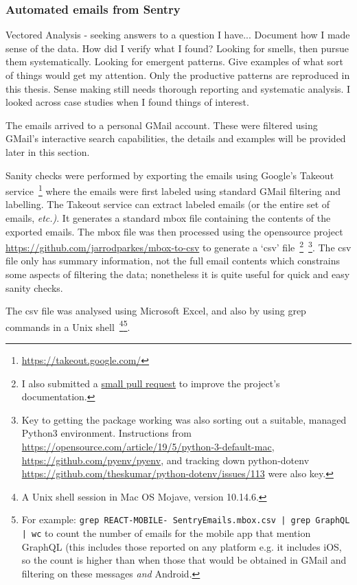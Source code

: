 \subsubsection{Automated emails from Sentry}
Vectored Analysis - seeking answers to a question I have...
Document how I made sense of the data. How did I verify what I found?
Looking for smells, then pursue them systematically. Looking for emergent patterns. Give examples of what sort of things would get my attention. Only the productive patterns are reproduced in this thesis. Sense making still needs thorough reporting and systematic analysis. I looked across case studies when I found things of interest.


The emails arrived to a personal GMail account. These were filtered using GMail's interactive search capabilities, the details and examples will be provided later in this section. 

Sanity checks were performed by exporting the emails using Google's Takeout service~\footnote{\url{https://takeout.google.com/}} where the emails were first labeled using standard GMail filtering and labelling. The Takeout service can extract labeled emails (or the entire set of emails, \emph{etc.)}. It generates a standard mbox file containing the contents of the exported emails. The mbox file was then processed using the opensource project \url{https://github.com/jarrodparkes/mbox-to-csv} to generate a `csv' file~\footnote{I also submitted a \href{https://github.com/julianharty/mbox-to-csv/commit/1400823b80b909a6736bccf35ae53707a91685f7}{small pull request} to improve the project's documentation.}~\footnote{Key to getting the package working was also sorting out a suitable, managed Python3 environment. Instructions from \url{https://opensource.com/article/19/5/python-3-default-mac}, \url{https://github.com/pyenv/pyenv}, and tracking down python-dotenv \url{https://github.com/theskumar/python-dotenv/issues/113} were also key.}. The csv file only has summary information, not the full email contents which constrains some aspects of filtering the data; nonetheless it is quite useful for quick and easy sanity checks. 

The csv file was analysed using Microsoft Excel, and also by using grep commands in a Unix shell~\footnote{A Unix shell session in Mac OS Mojave, version 10.14.6.}\footnote{For example: \texttt{grep REACT-MOBILE- SentryEmails.mbox.csv | grep GraphQL | wc} to count the number of emails for the mobile app that mention GraphQL (this includes those reported on any platform e.g. it includes iOS, so the count is higher than when those that would be obtained in GMail and filtering on these messages \textit{and} Android.}. %

